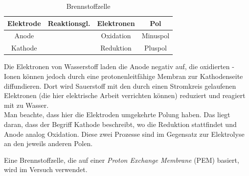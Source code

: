 \begin{table}[h]
\centering
\caption{Brennstoffzelle}
\begin{tabularx}{0.8\textwidth}{cTcc}
\toprule
Elektrode & Reaktionsgl. & Elektronen & Pol \\\midrule
Anode &   & Oxidation & Minuspol\\\midrule
Kathode &   & Reduktion & Pluspol \\\bottomrule
\end{tabularx}
\label{table:Wasserstoffweg}
\end{table}

Die Elektronen von Wasserstoff laden die Anode negativ auf, die oxidierten -Ionen können jedoch durch eine protonenleitfähige Membran zur Kathodenseite diffundieren. Dort wird Sauerstoff mit den durch einen Stromkreis gelaufenen Elektronen (die hier elektrische Arbeit verrichten können) reduziert und reagiert mit  zu Wasser.\\
Man beachte, dass hier die Elektroden umgekehrte Polung haben. Das liegt daran, dass der Begriff Kathode beschreibt, wo die Reduktion stattfindet und Anode analog Oxidation. Diese zwei Prozesse sind im Gegensatz zur Elektrolyse an den jeweils anderen Polen.

Eine Brennstoffzelle, die auf einer \emph{Proton Exchange Membrane} (PEM) basiert, wird im Versuch verwendet.
\newpage
{}